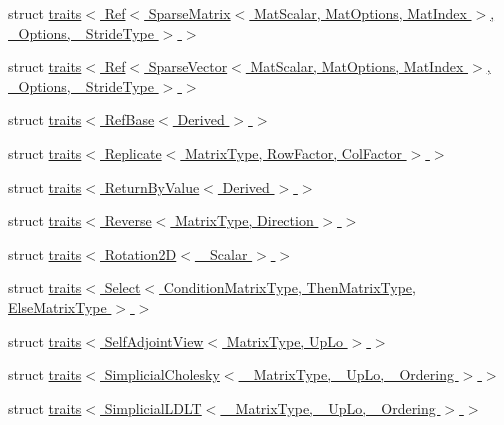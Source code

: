 \begin{DoxyCompactItemize}
\item 
struct \hyperlink{struct_eigen_1_1internal_1_1traits_3_01_ref_3_01_sparse_matrix_3_01_mat_scalar_00_01_mat_optionsa860cad8c30d0eada972a685a49da86f}{traits$<$ Ref$<$ Sparse\+Matrix$<$ Mat\+Scalar, Mat\+Options, Mat\+Index $>$, \+\_\+\+Options, \+\_\+\+Stride\+Type $>$ $>$}
\item 
struct \hyperlink{struct_eigen_1_1internal_1_1traits_3_01_ref_3_01_sparse_vector_3_01_mat_scalar_00_01_mat_optionsd46b48c0b126a924a96003bc7b99d5a2}{traits$<$ Ref$<$ Sparse\+Vector$<$ Mat\+Scalar, Mat\+Options, Mat\+Index $>$, \+\_\+\+Options, \+\_\+\+Stride\+Type $>$ $>$}
\item 
struct \hyperlink{struct_eigen_1_1internal_1_1traits_3_01_ref_base_3_01_derived_01_4_01_4}{traits$<$ Ref\+Base$<$ Derived $>$ $>$}
\item 
struct \hyperlink{struct_eigen_1_1internal_1_1traits_3_01_replicate_3_01_matrix_type_00_01_row_factor_00_01_col_factor_01_4_01_4}{traits$<$ Replicate$<$ Matrix\+Type, Row\+Factor, Col\+Factor $>$ $>$}
\item 
struct \hyperlink{struct_eigen_1_1internal_1_1traits_3_01_return_by_value_3_01_derived_01_4_01_4}{traits$<$ Return\+By\+Value$<$ Derived $>$ $>$}
\item 
struct \hyperlink{struct_eigen_1_1internal_1_1traits_3_01_reverse_3_01_matrix_type_00_01_direction_01_4_01_4}{traits$<$ Reverse$<$ Matrix\+Type, Direction $>$ $>$}
\item 
struct \hyperlink{struct_eigen_1_1internal_1_1traits_3_01_rotation2_d_3_01___scalar_01_4_01_4}{traits$<$ Rotation2\+D$<$ \+\_\+\+Scalar $>$ $>$}
\item 
struct \hyperlink{struct_eigen_1_1internal_1_1traits_3_01_select_3_01_condition_matrix_type_00_01_then_matrix_type4a832542e824e444643efa2ac02419b2}{traits$<$ Select$<$ Condition\+Matrix\+Type, Then\+Matrix\+Type, Else\+Matrix\+Type $>$ $>$}
\item 
struct \hyperlink{struct_eigen_1_1internal_1_1traits_3_01_self_adjoint_view_3_01_matrix_type_00_01_up_lo_01_4_01_4}{traits$<$ Self\+Adjoint\+View$<$ Matrix\+Type, Up\+Lo $>$ $>$}
\item 
struct \hyperlink{struct_eigen_1_1internal_1_1traits_3_01_simplicial_cholesky_3_01___matrix_type_00_01___up_lo_00_01___ordering_01_4_01_4}{traits$<$ Simplicial\+Cholesky$<$ \+\_\+\+Matrix\+Type, \+\_\+\+Up\+Lo, \+\_\+\+Ordering $>$ $>$}
\item 
struct \hyperlink{struct_eigen_1_1internal_1_1traits_3_01_simplicial_l_d_l_t_3_01___matrix_type_00_01___up_lo_00_01___ordering_01_4_01_4}{traits$<$ Simplicial\+L\+D\+L\+T$<$ \+\_\+\+Matrix\+Type, \+\_\+\+Up\+Lo, \+\_\+\+Ordering $>$ $>$}

\end{DoxyCompactItemize}
